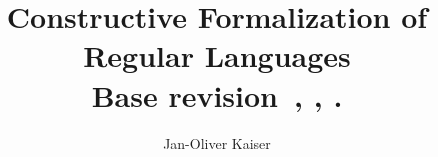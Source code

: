 \title{Constructive Formalization of Regular Languages
    \\\small{Base revision~\GITAbrHash, \GITAuthorDate, \GITAuthorName.}
}
\author{Jan-Oliver Kaiser}
